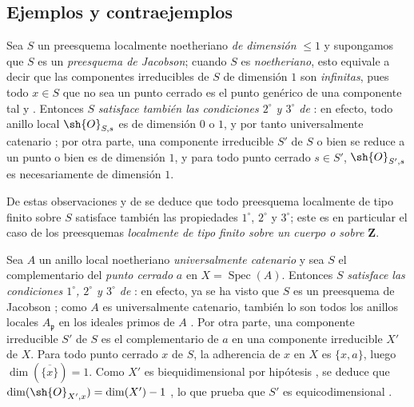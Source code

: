 \subsection{Ejemplos y contraejemplos}
\label{subsection:IV.10.7}

\begin{env}[10.7.1]
\label{IV.10.7.1}
Sea $S$ un preesquema localmente noetheriano \emph{de dimensión} $\leq 1$ y supongamos que $S$ es un \emph{preesquema de Jacobson}; cuando $S$ es \emph{noetheriano}, esto equivale a decir que las componentes irreducibles de $S$ de dimensión $1$ son \emph{infinitas}, pues todo $x\in S$ que no sea un punto cerrado es el punto genérico de una componente tal  y .
Entonces $S$ \emph{satisface también las condiciones $2^\circ$ y $3^\circ$ de} : en efecto, todo anillo local $\sh{O}_{S,s}$ es de dimensión $0$ o $1$, y por tanto universalmente catenario ; por otra parte, una componente irreducible $S'$ de $S$ o bien se reduce
a un punto o bien es de dimensión $1$, y para todo punto cerrado $s\in S'$, $\sh{O}_{S',s}$ es necesariamente de dimensión $1$.

De estas observaciones y de  se deduce que todo preesquema localmente de tipo finito sobre $S$ satisface también las propiedades $1^\circ$, $2^\circ$ y $3^\circ$; este es en particular el caso de los preesquemas \emph{localmente de tipo finito sobre un cuerpo o sobre $\mathbf{Z}$}.
\end{env}

\begin{env}[10.7.2]
\label{IV.10.7.2}
Sea $A$ un anillo local noetheriano \emph{universalmente catenario} y sea $S$ el complementario del \emph{punto cerrado} $a$ en $X=\operatorname{Spec}(A)$.
Entonces $S$ \emph{satisface las condiciones $1^\circ$, $2^\circ$ y $3^\circ$ de} : en efecto, ya se ha visto que $S$ es un preesquema de Jacobson ; como $A$ es universalmente catenario, también lo son todos los anillos locales $A_\mathfrak{p}$ en los ideales primos de $A$ .
Por otra parte, una componente irreducible $S'$ de $S$ es el complementario de $a$ en una componente irreducible $X'$ de $X$. Para todo punto cerrado $x$ de $S$, la adherencia de $x$ en $X$ es $\{x,a\}$, luego $\dim(\overline{\{x\}})=1$. Como $X'$ es biequidimensional por hipótesis , se deduce que $\dim(\sh{O}_{X',x})=\dim(X')-1$ , lo que prueba que $S'$ es equicodimensional .
\end{env}

